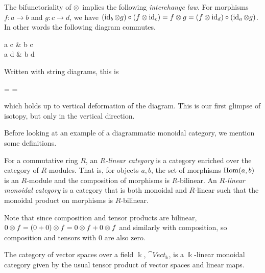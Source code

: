The bifunctoriality of $\otimes$ implies the following \textit{interchange law}. For morphisms $f: a \to b$ and $g: c \to d$, we have $(\operatorname{id}_b \otimes g) \circ (f \otimes \operatorname{id}_c) = f \otimes g = (f \otimes \operatorname{id}_d) \circ (\operatorname{id}_a \otimes g)$. In other words the following diagram commutes.

\begin{center}
    \begin{mytikzcd}[sep=large]
        a \tensor c \arrow[r,"f \tensor \id_c"] \arrow[d, "\id_a \tensor g"'] \arrow[dr, "f \tensor g"]
        & b \tensor c \arrow[d, "\id_b \tensor g"] \\
        a \tensor d \arrow[r,"f \tensor \id_d"]
        & b \tensor d
    \end{mytikzcd}
\end{center}
Written with string diagrams, this is
\begin{center}
    = 
    = 
\end{center}
which holds up to vertical deformation of the diagram. This is our first glimpse of isotopy, but only in the vertical direction.

 Before looking at an example of a diagrammatic monoidal category, we mention some definitions.

\begin{definition}
    For a commutative ring $R$, an \textit{$R$-linear category} is a category enriched over the category of $R$-modules. That is, for objects $a,b$, the set of morphisms $\operatorname{Hom}(a,b)$ is an $R$-module and the composition of morphisms is $R$-bilinear. An \textit{$R$-linear monoidal category} is a category that is both monoidal and $R$-linear such that the monoidal product on morphisms is $R$-bilinear.
\end{definition}


Note that since composition and tensor products are bilinear, $0 \otimes f = (0 + 0) \otimes f = 0 \otimes f + 0 \otimes f$ and similarly with composition, so composition and tensors with $0$ are also zero.

\begin{example}
    The category of vector spaces over a field $\Bbbk$, $\cat{Vect}_\Bbbk$, is a $\Bbbk$-linear monoidal category given by the usual tensor product of vector spaces and linear maps.
\end{example}


